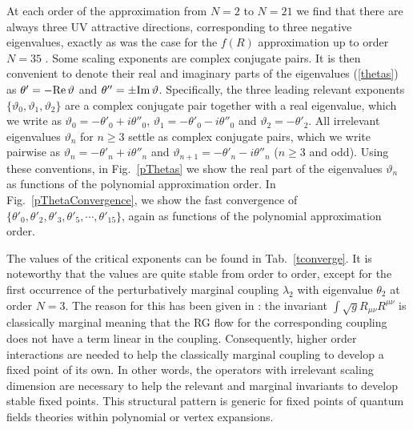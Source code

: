 \documentclass[notitlepage,eqsecnum,bm,amsmath,preprintnumbers,superscriptaddress,nofootinbib,aps,11pt]{revtex4-1}
\def\eq#1{(\ref{#1})}
\begin{document}
At each order of the approximation 
from $N=2$ to $N=21$ we find that there are always three UV attractive directions, corresponding to three negative eigenvalues, 
exactly as was the case for the $f(R)$ approximation up to order $N=35$ \cite{Falls:2013bv,Falls:2014tra}. 
Some scaling exponents are complex conjugate pairs. It is then convenient to denote their real and imaginary parts of the eigenvalues \eq{thetas}  as $\theta' =- {\rm Re}\,\vartheta$ and $\theta'' = \pm {\rm Im}\,\vartheta$.  Specifically, the three leading relevant exponents $\{\vartheta_0,\vartheta_1,\vartheta_2\}$ are a complex conjugate pair together with a real eigenvalue, which we write as $\vartheta_{0}=-\theta'_0+ i\theta''_0$, $\vartheta_{1}=-\theta'_0- i\theta''_0$ and $\vartheta_2=-\theta'_2$. All irrelevant eigenvalues $\vartheta_n$ for $n\ge 3$ settle as complex conjugate pairs,  which we write pairwise as $\vartheta_{n}=-\theta'_n+i \theta''_n$ and $\vartheta_{n+1}=-\theta'_n-i\theta''_n$ ($n\ge 3$ and odd).
Using these conventions, in Fig.~\ref{pThetas} we show the real part of the eigenvalues $\vartheta_n$ as functions of the polynomial approximation order. In  Fig.~\ref{pThetaConvergence}, we show  the fast convergence of $\{\theta'_0,\theta'_2,\theta'_3,\theta'_5,\cdots,\theta'_{15}\}$, again as functions of the  polynomial approximation order.



The values of the critical exponents can be found in 
Tab.~\ref{tconverge}. It is noteworthy that the values are quite stable from order to order, except for the first occurrence of the perturbatively marginal coupling $\lambda_2$ with eigenvalue $\theta_2$ at order $N=3$. The reason for this has been given in \cite{Falls:2014tra}: the invariant $\int\sqrt{g}R_{\mu\nu} R^{\mu\nu}$  is classically marginal meaning that the RG flow for the corresponding coupling does not have a term linear in the coupling. Consequently, higher order interactions are needed to help the classically marginal coupling to develop a fixed point of its own. In other words, the operators with irrelevant scaling dimension are necessary to help the relevant and marginal invariants to develop stable fixed points. This structural pattern is generic for fixed points of quantum fields theories within polynomial or vertex expansions. 
\end{document}
